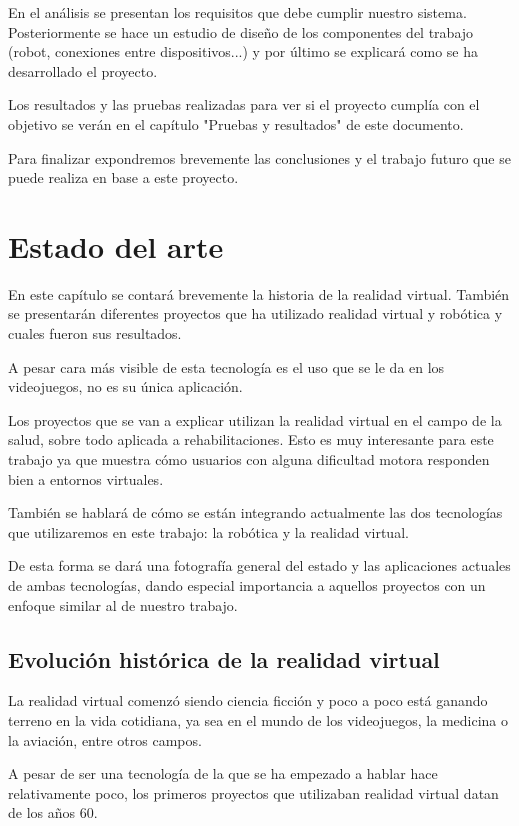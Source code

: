 \documentclass[twoside, 12pt]{epstfg}
\begin{document}
En el análisis se presentan los requisitos que debe cumplir nuestro sistema. Posteriormente se hace un estudio de diseño de los componentes del trabajo (robot, conexiones entre dispositivos...) y por último se explicará como se ha desarrollado el proyecto.

Los resultados y las pruebas realizadas para ver si el proyecto cumplía con el objetivo se verán en el capítulo "Pruebas y resultados" de este documento.

Para finalizar expondremos brevemente las conclusiones y el trabajo futuro que se puede realiza en base a este proyecto.

\chapter{Estado del arte}


En este capítulo se contará brevemente la historia de la realidad virtual.
También se presentarán diferentes proyectos que ha utilizado realidad virtual y robótica y cuales fueron sus resultados.

A pesar cara más visible de esta tecnología es el uso que se le da en los videojuegos, no es su única aplicación.

Los proyectos que se van a explicar utilizan la realidad virtual en el campo de la salud, sobre todo aplicada a rehabilitaciones. Esto es muy interesante para este trabajo ya que muestra cómo usuarios con alguna dificultad motora responden bien a entornos virtuales.

También se hablará de cómo se están integrando actualmente  las dos tecnologías que utilizaremos en este trabajo: la robótica y la realidad virtual.

De esta forma se dará una fotografía general del estado y las aplicaciones actuales de ambas tecnologías, dando especial importancia a aquellos proyectos con un enfoque similar al de nuestro trabajo.

\section{Evolución histórica de la realidad virtual}
La realidad virtual comenzó siendo ciencia ficción y poco a poco está ganando terreno en la vida cotidiana, ya sea en el mundo de los videojuegos, la medicina o la aviación, entre otros campos.

A pesar de ser una tecnología de la que se ha empezado a hablar hace relativamente poco, los primeros proyectos que utilizaban realidad virtual datan de los años 60.
\end{document}
